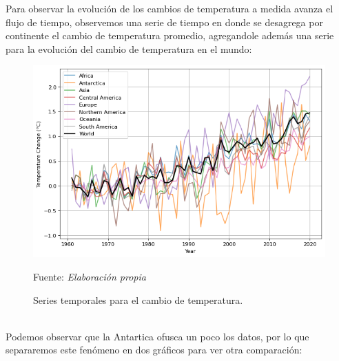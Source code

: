 \documentclass[12pt]{article}
\newcommand{\source}[1]{\caption*{Fuente: {\textit{#1}}} }
\begin{document}
Para observar la evolución de los cambios de temperatura a medida avanza el flujo de tiempo, observemos una serie de tiempo en donde se desagrega por continente el cambio de temperatura promedio, agregandole además una serie para la evolución del cambio de temperatura en el mundo:
\begin{figure}[H]
    \centering
    \includegraphics[scale=0.5]{fig/fig_2.png}
    \caption{Series temporales para el cambio de temperatura.}
    \vspace{-0.3cm}
    \source{Elaboración propia}
    \label{fig:fig_1}
\end{figure}\\
Podemos observar que la Antartica ofusca un poco los datos, por lo que separaremos este fenómeno en dos gráficos para ver otra comparación:
\end{document}
